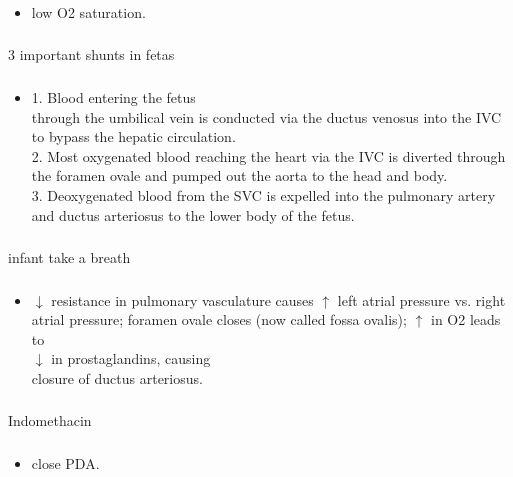 \documentclass[11pt]{beamer}
\begin{document}
\begin{frame}
 \frametitle{}
\begin{itemize}
\item{low O2 saturation.}
\end{itemize}
\end{frame}

\begin{frame}
 \frametitle{}
3 important shunts in fetas 
\end{frame}

\begin{frame}
 \frametitle{}
\begin{itemize}
\item{1. Blood entering the fetus \\ through the umbilical vein is conducted via the ductus venosus into the IVC to bypass the hepatic circulation.  \\ 2. Most oxygenated blood reaching the heart via the IVC is diverted through the foramen ovale and pumped out the aorta to the head and body. \\ 3. Deoxygenated blood from the SVC is expelled into the pulmonary artery and ductus arteriosus to the lower body of the fetus.}
\end{itemize}
\end{frame}

\begin{frame}
 \frametitle{}
infant take a breath 
\end{frame}

\begin{frame}
 \frametitle{}
\begin{itemize}
\item{${\downarrow}$ resistance in pulmonary vasculature causes ${\uparrow}$ left atrial pressure vs. right atrial pressure; foramen ovale closes (now called fossa ovalis); ${\uparrow}$ in O2 leads to \\ ${\downarrow}$ in prostaglandins, causing \\ closure of ductus arteriosus.}
\end{itemize}
\end{frame}

\begin{frame}
 \frametitle{}
Indomethacin
\end{frame}

\begin{frame}
 \frametitle{}
\begin{itemize}
\item{close PDA.}
\end{itemize}
\end{frame}
\end{document}
